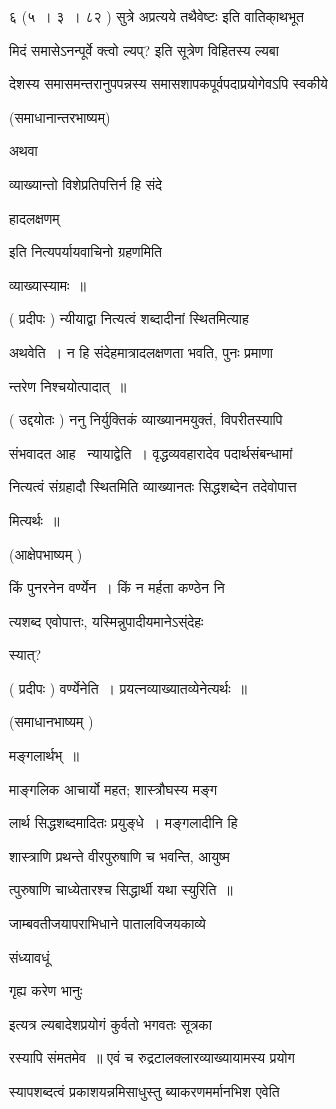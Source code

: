\documentclass[11pt, openany]{book}
\begin{document}
६ (५~। ३~। ८२ ) सुत्रे अप्रत्यये तथैवेष्टः इति वातिका्थभूत \textendash\ 

मिदं {\qt समासेऽनन्पूर्वे क्त्वो ल्यप्?} इति सूत्रेण विहितस्य ल्यबा \textendash\ 

देशस्य समासमन्तरानुपपन्नस्य समासशापकपूर्वपदाप्रयोगेवऽपि स्वकीये 



(समाधानान्तरभाष्यम्)

अथवा {\qt व्याख्यान्तो विशेप्रतिपत्तिर्न हि संदे 

 हादलक्षणम्} इति नित्यपर्यायवाचिनो ग्रहणमिति 

व्याख्यास्यामः~॥ 

( प्रदीपः ) न्यीयाद्वा नित्यत्वं शब्दादीनां स्थितमित्याह \textendash\ 

अथवेति~। न हि संदेहमात्रादलक्षणता भवति, पुनः प्रमाणा \textendash\ 

न्तरेण निश्चयोत्पादात्~॥ 

( उद्दयोतः ) ननु निर्युक्तिकं व्याख्यानमयुक्तं, विपरीतस्यापि 

संभवादत आह \textendash\ न्यायाद्वेति~। वृद्धव्यवहारादेव पदार्थसंबन्धामां 

नित्यत्वं संग्रहादौ स्थितमिति व्याख्यानतः सिद्धशब्देन तदेवोपात्त \textendash\ 

मित्यर्थः~॥ 

(आक्षेपभाष्यम् ) 

किं पुनरनेन वर्ण्येन~। किं न मर्हता कण्ठेन नि \textendash\ 

त्यशब्द एवोपात्तः, यस्मिन्नुपादीयमानेऽस्ंदेहः 

स्यात्?

( प्रदीपः ) वर्ण्येनेति~। प्रयत्नव्याख्यातव्येनेत्यर्थः~॥ 

(समाधानभाष्यम् ) 

मङ्गलार्थभ्~॥ 

माङ्गलिक आचार्यो महत; शास्त्रौघस्य मङ्ग \textendash\ 

लार्थ सिद्धशब्दमादितः प्रयुङ्धे~। मङ्गलादीनि हि 

शास्त्राणि प्रथन्ते वीरपुरुषाणि च भवन्ति, आयुष्म \textendash\ 

त्पुरुषाणि चाध्येतारश्च सिद्धार्थी यथा स्युरिति~॥ 

जाम्बवतीजयापराभिधाने पातालविजयकाव्ये {\qt संध्यावधूं 

गृह्य करेण भानुः} इत्यत्र ल्यबादेशप्रयोगं कुर्वतो भगवतः सूत्रका \textendash\ 

रस्यापि संमतमेव~॥ एवं च रुद्रटालक्लारव्याख्यायामस्य प्रयोग \textendash\ 

स्यापशब्दत्वं प्रकाशयन्नमिसाधुस्तु ब्याकरणमर्मानभिश एवेति 
\end{document}

